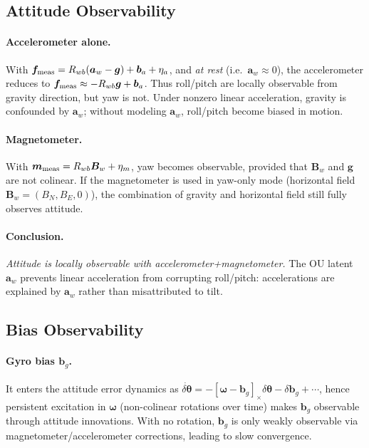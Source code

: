 \documentclass[10pt]{extarticle}
\begin{document}
\subsection{Attitude Observability}
\paragraph{Accelerometer alone.} With $\bm f_{\rm meas}=R_{wb}(\bm a_w-\bm g)+\bm b_a+\eta_a$,
and \emph{at rest} (i.e.\ $\bm a_w\approx 0$), the accelerometer reduces to
$\bm f_{\rm meas}\approx -R_{wb}\bm g+\bm b_a$. Thus roll/pitch are locally observable
from gravity direction, but yaw is not. Under nonzero linear acceleration, gravity is
confounded by $\bm a_w$; without modeling $\bm a_w$, roll/pitch become biased in motion.

\paragraph{Magnetometer.} With $\bm m_{\rm meas}=R_{wb}\bm B_w+\eta_m$, yaw becomes observable,
provided that $\bm B_w$ and $\bm g$ are not colinear. If the magnetometer is used in
yaw-only mode (horizontal field $\bm B_w=(B_N,B_E,0)$), the combination of gravity and
horizontal field still fully observes attitude.

\paragraph{Conclusion.} \emph{Attitude is locally observable with accelerometer+magnetometer.}
The OU latent $\bm a_w$ prevents linear acceleration from corrupting roll/pitch:
accelerations are explained by $\bm a_w$ rather than misattributed to tilt.

\subsection{Bias Observability}
\paragraph{Gyro bias $\bm b_g$.} It enters the attitude error dynamics as 
$\dot{\delta\bm\theta}=-[\bm\omega-\bm b_g]_\times\delta\bm\theta - \delta\bm b_g + \cdots$,
hence persistent excitation in $\bm\omega$ (non-colinear rotations over time) makes
$\bm b_g$ observable through attitude innovations. With no rotation, $\bm b_g$ is only
weakly observable via magnetometer/accelerometer corrections, leading to slow convergence.
\end{document}
